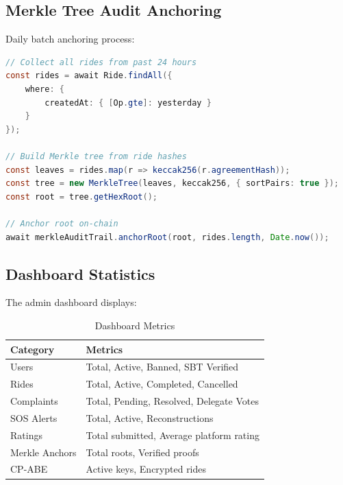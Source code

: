 \subsection{Merkle Tree Audit Anchoring}

Daily batch anchoring process:

\begin{lstlisting}[language=Java, caption=Merkle Tree Anchoring]
// Collect all rides from past 24 hours
const rides = await Ride.findAll({
    where: {
        createdAt: { [Op.gte]: yesterday }
    }
});

// Build Merkle tree from ride hashes
const leaves = rides.map(r => keccak256(r.agreementHash));
const tree = new MerkleTree(leaves, keccak256, { sortPairs: true });
const root = tree.getHexRoot();

// Anchor root on-chain
await merkleAuditTrail.anchorRoot(root, rides.length, Date.now());
\end{lstlisting}

\subsection{Dashboard Statistics}

The admin dashboard displays:

\begin{table}[H]
\centering
\caption{Dashboard Metrics}
\begin{tabular}{|l|l|}
\hline
\textbf{Category} & \textbf{Metrics} \\
\hline
Users & Total, Active, Banned, SBT Verified \\
Rides & Total, Active, Completed, Cancelled \\
Complaints & Total, Pending, Resolved, Delegate Votes \\
SOS Alerts & Total, Active, Reconstructions \\
Ratings & Total submitted, Average platform rating \\
Merkle Anchors & Total roots, Verified proofs \\
CP-ABE & Active keys, Encrypted rides \\
\hline
\end{tabular}
\end{table}
